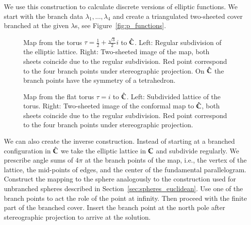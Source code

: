 \documentclass[Thesis]{subfiles}
\begin{document}
We use this construction to calculate discrete versions of elliptic functions.
We start with the branch data $\lambda_1,\ldots,\lambda_{4}$ and create a triangulated two-sheeted cover branched at the given $\lambda$s, see Figure~\ref{fig:p_functions}.


\begin{figure}
\centering
{}
\caption{
Map from the torus $\tau=\frac{1}{2}+\frac{\sqrt 3}{2}i$ to $\hat{\mathbb C}$. 
Left: Regular subdivision of the elliptic lattice. 
Right: Two-sheeted image of the map, both sheets coincide due to the regular subdivision. 
Red point correspond to the four branch points under stereographic projection.
On $\hat{\mathbb C}$ the branch points have the symmetry of a tetrahedron.
} 
\label{fig:wente_elliptic}
\end{figure}

\begin{figure}
\centering
{}
\caption{
Map from the flat torus $\tau=i$ to $\hat{\mathbb C}$. 
Left: Subdivided lattice of the torus. 
Right: Two-sheeted image of the conformal map to $\hat{\mathbb C}$, both sheets coincide due to the regular subdivision. 
Red point correspond to the four branch points under stereographic projection.
}
\label{fig:square_elliptic} 
\end{figure}

We can also create the inverse construction. 
Instead of starting at a branched configuration in $\hat {\mathbb C}$ we take the elliptic lattice in $\mathbb C$ and subdivide regularly.
We prescribe angle sums of $4\pi$ at the branch points of the map, i.e., the vertex of the lattice, the mid-points of edges, and the center of the fundamental parallelogram.
Construct the mapping to the sphere analogously to the construction used for unbranched spheres described in Section~\ref{sec:spheres_euclidean}.
Use one of the branch points to act the role of the point at infinity.
Then proceed with the finite part of the branched cover.
Insert the branch point at the north pole after stereographic projection to arrive at the solution.
\end{document}
